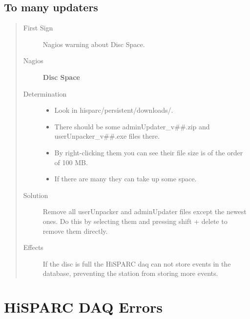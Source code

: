\documentclass[a4paper,11pt,english]{sphinxmanual}
\begin{document}
\subsection{To many updaters}
\label{known-issues:to-many-updaters}\begin{quote}\begin{description}
\item[{First Sign}] \leavevmode
Nagios warning about Disc Space.

\item[{Nagios}] \leavevmode
\textbf{Disc Space}

\item[{Determination}] \leavevmode\begin{itemize}
\item {} 
Look in hisparc/persistent/downloads/.

\item {} 
There should be some adminUpdater\_v\#\#.zip and userUnpacker\_v\#\#.exe files there.

\item {} 
By right-clicking them you can see their file size is of the order of 100 MB.

\item {} 
If there are many they can take up some space.

\end{itemize}

\item[{Solution}] \leavevmode
Remove all userUnpacker and adminUpdater files except the newest ones. Do this by selecting them and pressing shift + delete to remove them directly.

\item[{Effects}] \leavevmode
If the disc is full the HiSPARC daq can not store events in the database, preventing the station from storing more events.

\end{description}\end{quote}


\section{HiSPARC DAQ Errors}
\label{known-issues:hisparc-daq-errors}
\end{document}
